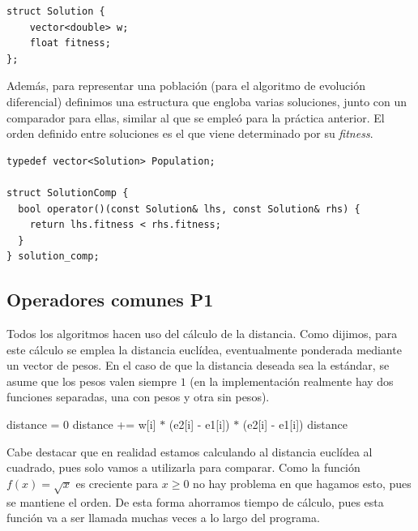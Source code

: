 \documentclass[12pt]{article}
\begin{document}
\begin{verbatim}
struct Solution {
    vector<double> w;
    float fitness;
};
\end{verbatim}

Además, para representar una población (para el algoritmo de evolución diferencial) definimos una estructura que engloba varias soluciones, junto con un comparador para ellas, similar al que se empleó para la práctica anterior. El orden definido entre soluciones es el que viene determinado por su \textit{fitness}.

\begin{verbatim}
typedef vector<Solution> Population;

struct SolutionComp {
  bool operator()(const Solution& lhs, const Solution& rhs) {
    return lhs.fitness < rhs.fitness;
  }
} solution_comp;
\end{verbatim}

\subsection*{{\color{red}Operadores comunes P1}}

Todos los algoritmos hacen uso del cálculo de la distancia. Como dijimos, para este cálculo se emplea la distancia euclídea, eventualmente ponderada mediante un vector de pesos. En el caso de que la distancia deseada sea la estándar, se asume que los pesos valen siempre $1$ (en la implementación realmente hay dos funciones separadas, una con pesos y otra sin pesos).

\begin{algorithm}[ht!]
\begin{algorithmic}

     \State distance = $0$
       
            \State distance += w[i] $\ast$ (e2[i] - e1[i]) $\ast$ (e2[i] - e1[i])
         \EndIf
     \EndFor
     \State \Return distance
\EndFunction

\end{algorithmic}
\end{algorithm}

Cabe destacar que en realidad estamos calculando al distancia euclídea al cuadrado, pues solo vamos a utilizarla para comparar. Como la función $f(x)=\sqrt{x}$ es creciente para $x\geq 0$ no hay problema en que hagamos esto, pues se mantiene el orden. De esta forma ahorramos tiempo de cálculo, pues esta función va a ser llamada muchas veces a lo largo del programa.\\
\end{document}
